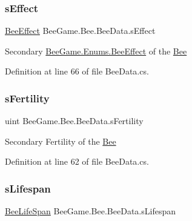 \subsubsection{\texorpdfstring{s\+Effect}{sEffect}}
{\footnotesize\ttfamily \hyperlink{namespace_bee_game_1_1_enums_acf7ae32a86385a40fc0c7b55af95c6c3}{Bee\+Effect} Bee\+Game.\+Bee.\+Bee\+Data.\+s\+Effect}



Secondary \hyperlink{namespace_bee_game_1_1_enums_acf7ae32a86385a40fc0c7b55af95c6c3}{Bee\+Game.\+Enums.\+Bee\+Effect} of the \hyperlink{namespace_bee_game_1_1_bee}{Bee} 



Definition at line 66 of file Bee\+Data.\+cs.

\mbox{\label{struct_bee_game_1_1_bee_1_1_bee_data_a20a4084334bbbba3942f67622596b596}} 
\subsubsection{\texorpdfstring{s\+Fertility}{sFertility}}
{\footnotesize\ttfamily uint Bee\+Game.\+Bee.\+Bee\+Data.\+s\+Fertility}



Secondary Fertility of the \hyperlink{namespace_bee_game_1_1_bee}{Bee} 



Definition at line 62 of file Bee\+Data.\+cs.

\mbox{\label{struct_bee_game_1_1_bee_1_1_bee_data_af5c384db9813e463bb0d66cb8b443d87}} 
\subsubsection{\texorpdfstring{s\+Lifespan}{sLifespan}}
{\footnotesize\ttfamily \hyperlink{namespace_bee_game_1_1_enums_ae3853807ded2f4d99a0d4a7fb4b2bc46}{Bee\+Life\+Span} Bee\+Game.\+Bee.\+Bee\+Data.\+s\+Lifespan}



